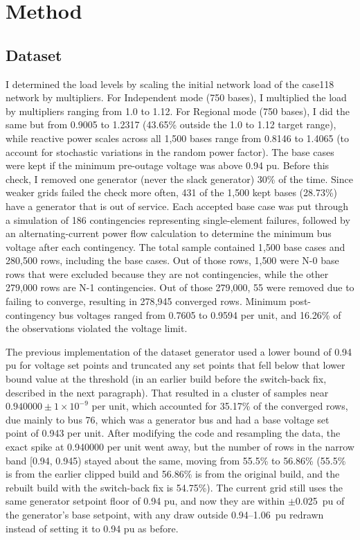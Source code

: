 \documentclass[12pt]{article}
\begin{document}
\section{Method}
\label{sec:method}

\subsection{Dataset}\label{subsec:dataset}

I determined the load levels by scaling the initial network load of the case118 network by multipliers. For Independent mode (750 bases), I multiplied the load by multipliers ranging from 1.0 to 1.12. For Regional mode (750 bases), I did the same but from 0.9005 to 1.2317 (43.65\% outside the 1.0 to 1.12 target range), while reactive power scales across all 1,500 bases range from 0.8146 to 1.4065 (to account for stochastic variations in the random power factor). The base cases were kept if the minimum pre-outage voltage was above 0.94 pu. Before this check, I removed one generator (never the slack generator) 30\% of the time. Since weaker grids failed the check more often, 431 of the 1{,}500 kept bases (28.73\%) have a generator that is out of service. Each accepted base case was put through a simulation of 186 contingencies representing single-element failures, followed by an alternating-current power flow calculation to determine the minimum bus voltage after each contingency. The total sample contained 1{,}500 base cases and 280{,}500 rows, including the base cases. Out of those rows, 1{,}500 were N-0 base rows that were excluded because they are not contingencies, while the other 279{,}000 rows are N-1 contingencies. Out of those 279{,}000, 55 were removed due to failing to converge, resulting in 278{,}945 converged rows. Minimum post-contingency bus voltages ranged from 0.7605 to 0.9594 per unit, and 16.26\% of the observations violated the voltage limit. 

The previous implementation of the dataset generator used a lower bound of 0.94 pu for voltage set points and truncated any set points that fell below that lower bound value at the threshold (in an earlier build before the switch-back fix, described in the next paragraph). That resulted in a cluster of samples near $0.940000 \pm 1\times10^{-9}$ per unit, which accounted for 35.17\% of the converged rows, due mainly to bus 76, which was a generator bus and had a base voltage set point of 0.943 per unit. After modifying the code and resampling the data, the exact spike at 0.940000 per unit went away, but the number of rows in the narrow band [0.94, 0.945) stayed about the same, moving from 55.5\% to 56.86\% (55.5\% is from the earlier clipped build and 56.86\% is from the original build, and the rebuilt build with the switch-back fix is 54.75\%). The current grid still uses the same generator setpoint floor of 0.94 pu, and now they are within $\pm$0.025~pu of the generator's base setpoint, with any draw outside 0.94--1.06~pu redrawn instead of setting it to 0.94 pu as before.
\end{document}
